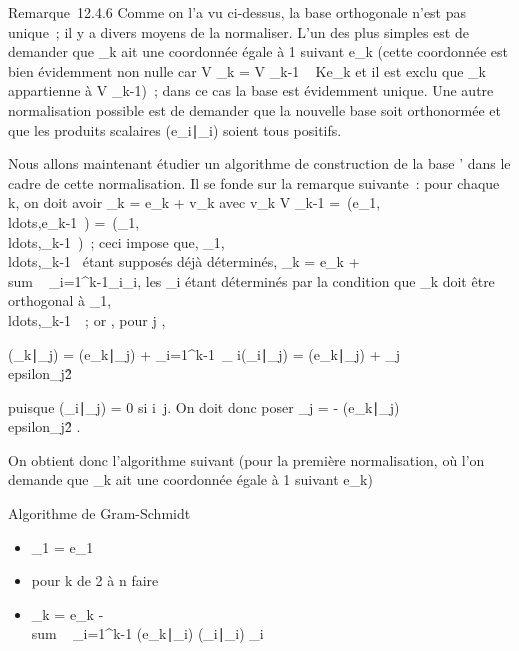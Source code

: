 \documentclass[]{article}
\begin{document}
Remarque~12.4.6 Comme on l'a vu ci-dessus, la base orthogonale n'est pas
unique~; il y a divers moyens de la normaliser. L'un des plus simples
est de demander que \epsilon_k ait une coordonnée égale à 1 suivant
e_k (cette coordonnée est bien évidemment non nulle car V
_k = V _k-1 \oplus~ Ke_k et il est exclu que
\epsilon_k appartienne à V _k-1)~; dans ce cas la base est
évidemment unique. Une autre normalisation possible est de demander que
la nouvelle base soit orthonormée et que les produits scalaires
(e_i∣\epsilon_i) soient tous
positifs.

Nous allons maintenant étudier un algorithme de construction de la base
' dans le cadre de cette normalisation. Il se fonde sur la remarque
suivante~: pour chaque k, on doit avoir \epsilon_k = e_k +
v_k avec v_k \in V _k-1
=\
\mathrmVect(e_1,\\ldots,e_k-1~)
=\
\mathrmVect(\epsilon_1,\\ldots,\epsilon_k-1~)~;
ceci impose que,
\epsilon_1,\\ldots,\epsilon_k-1~
étant supposés déjà déterminés, \epsilon_k = e_k
+ \\sum ~
_i=1^k-1\alpha_i\epsilon_i, les \alpha_i étant
déterminés par la condition que \epsilon_k doit être orthogonal à
\epsilon_1,\\ldots,\epsilon_k-1~~;
or , pour j \in [1,k - 1],

(\epsilon_k∣\epsilon_j) =
(e_k∣\epsilon_j) +
\sum _i=1^k-1\alpha~_
i(\epsilon_i∣\epsilon_j) =
(e_k∣\epsilon_j) +
\alpha_j\\epsilon_j\^2

puisque (\epsilon_i∣\epsilon_j) = 0 si
i\neq~j. On doit donc poser \alpha_j = -
(e_k∣\epsilon_j)
\over
\\epsilon_j\^2
.

On obtient donc l'algorithme suivant (pour la première normalisation, où
l'on demande que \epsilon_k ait une coordonnée égale à 1 suivant
e_k)

Algorithme de Gram-Schmidt

\begin{itemize}
\itemsep1pt\parskip0pt
\item
  \epsilon_1 = e_1
\item
  pour k de 2 à n faire
\item
  \quad \quad \epsilon_k = e_k
  -\\sum ~
  _i=1^k-1
  (e_k∣\epsilon_i)
  \over
  (\epsilon_i∣\epsilon_i) \epsilon_i
\end{itemize}
\end{document}
